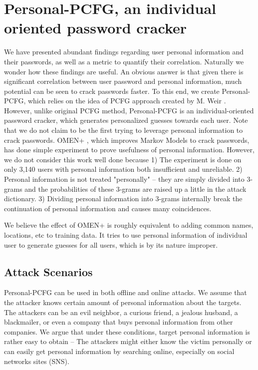 \section{Personal-PCFG, an individual oriented password cracker}
\label{personalpcfg}
We have presented abundant findings regarding user personal information and their passwords, as well as a metric to quantify their correlation. Naturally we wonder how these findings are useful. An obvious answer is that given there is significant correlation between user password and personal information, much potential can be seen to crack passwords faster. To this end, we create Personal-PCFG, which relies on the idea of PCFG approach created by M. Weir \cite{weir2009password}. However, unlike original PCFG method, Personal-PCFG is an individual-oriented password cracker, which generates personalized guesses towards each user. Note that we do not claim to be the first trying to leverage personal information to crack passwords. OMEN+ \cite{castelluccia2013privacy}, which improves Markov Models \cite{narayanan2005fast} to crack passwords, has done simple experiment to prove usefulness of personal information. However, we do not consider this work well done because 1) The experiment is done on only 3,140 users with personal information both insufficient and unreliable. 2) Personal information is not treated "personally" -- they are simply divided into 3-grams and the probabilities of these 3-grams are raised up a little in the attack dictionary. 3) Dividing personal information into 3-grams internally break the continuation of personal information and causes many coincidences. 

We believe the effect of OMEN+ \cite{castelluccia2013privacy} is roughly equivalent to adding common names, locations, etc to training data. It tries to use personal information of individual user to generate guesses for all users, which is by its nature improper. 

\subsection{Attack Scenarios}
Personal-PCFG can be used in both offline and online attacks. We assume that the attacker knows certain amount of personal information about the targets. The attackers can be an evil neighbor, a curious friend, a jealous husband, a blackmailer, or even a company that buys personal information from other companies. We argue that under these conditions, target personal information is rather easy to obtain -- The attackers might either know the victim personally or can easily get personal information by searching online, especially on social networks sites (SNS). 

